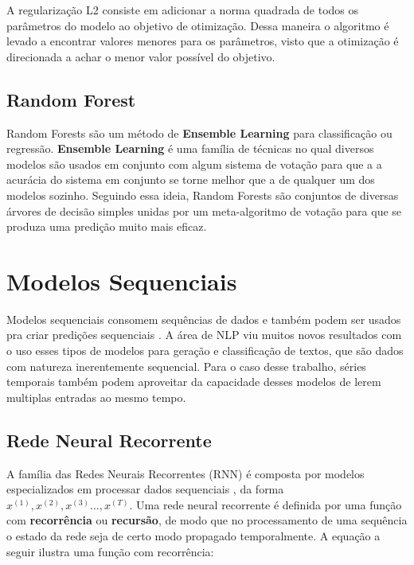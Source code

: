 A regularização L2 consiste em adicionar a norma quadrada de todos os parâmetros
do modelo ao objetivo de otimização. Dessa maneira o algoritmo é levado a
encontrar valores menores para os parâmetros, visto que a otimização é
direcionada a achar o menor valor possível do objetivo.

\subsection{Random Forest}

Random Forests são um método de \textbf{Ensemble Learning} para classificação ou regressão. \textbf{Ensemble Learning} é uma família de técnicas no qual diversos modelos  são usados em conjunto com algum sistema de votação para que a a acurácia do sistema em conjunto se torne melhor que a de qualquer um dos modelos sozinho. Seguindo essa ideia, Random Forests são conjuntos de diversas árvores de decisão simples unidas por um meta-algoritmo de votação para que se produza uma predição muito mais eficaz.


\section{Modelos Sequenciais}

Modelos sequenciais consomem sequências de dados e também podem ser usados pra
criar predições sequenciais \citep{dlbook}. A área de NLP viu muitos novos
resultados com o uso esses tipos de modelos para geração e classificação de textos, que são dados com
natureza inerentemente sequencial. Para o caso desse trabalho, séries temporais também podem
aproveitar da capacidade desses modelos de lerem multiplas entradas ao mesmo tempo.

\subsection{Rede Neural Recorrente}
% 

A família das Redes Neurais Recorrentes (RNN) é composta por modelos especializados
em processar dados sequenciais \citep{dlbook}, da forma $x^{(1)},x^{(2)} ,x^{(3)}\dots ,x^{(T)}$. Uma rede neural recorrente é definida por uma função com
\textbf{recorrência} ou \textbf{recursão}, de modo que no processamento de uma
sequência o estado da rede seja de certo modo propagado temporalmente. A equação
a seguir ilustra uma função com recorrência: \\

